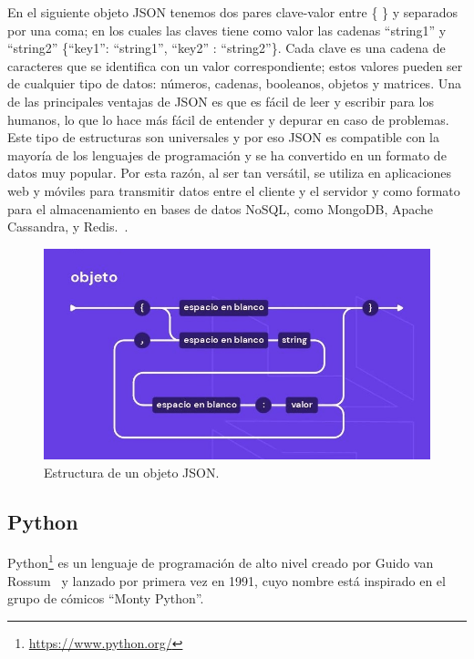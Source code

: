 \documentclass[a4paper, 12pt]{book}
\begin{document}
En el siguiente objeto JSON tenemos dos pares clave-valor entre \{ \} y separados por una coma; en los cuales las claves tiene como valor las cadenas ``string1'' y ``string2'' \{``key1'': ``string1'', ``key2'' : ``string2''\}. 
Cada clave es una cadena de caracteres que se identifica con un valor correspondiente; estos valores pueden ser de cualquier tipo de datos: números, cadenas, booleanos, objetos y matrices.
Una de las principales ventajas de JSON es que es fácil de leer y escribir para los humanos, lo que lo hace más fácil de entender y depurar en caso de problemas. 
Este tipo de estructuras son universales y por eso JSON es compatible con la mayoría de los lenguajes de programación y se ha convertido en un formato de datos muy popular.
Por esta razón, al ser tan versátil, se utiliza en aplicaciones web y móviles para transmitir datos entre el cliente y el servidor y como formato para el almacenamiento en bases de datos NoSQL, como MongoDB, Apache Cassandra, y Redis.~\cite{mora2016serializacion}. 

\begin{figure}
  \centering
  \includegraphics[width=12cm, keepaspectratio]{img/object-json.png}
  \caption{Estructura de un objeto JSON.}\label{fig:json}
\end{figure}

\newpage

\subsection{Python} %
\label{sec:python} %


Python\footnote{\url{https://www.python.org/}} es un lenguaje de programación de alto nivel creado por Guido van Rossum~\cite{challenger2014lenguaje} y lanzado por primera vez en 1991, cuyo nombre está inspirado en el grupo de cómicos “Monty Python”.  
\end{document}
